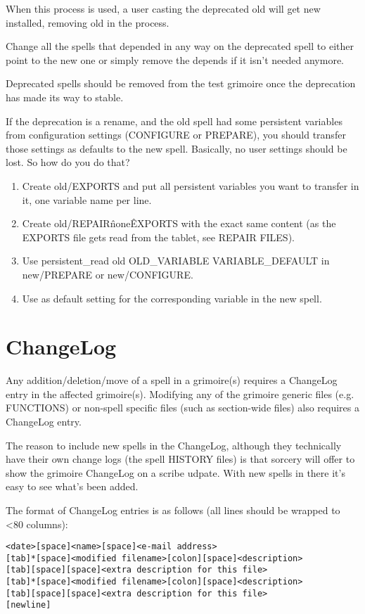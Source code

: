 \documentclass[a4paper,10pt]{book}
\begin{document}
When this process is used, a user casting the deprecated old will get new
installed, removing old in the process.

Change all the spells that depended in any way on the deprecated spell to
either point to the new one or simply remove the depends if it isn't needed
anymore.

Deprecated spells should be removed from the test grimoire once the
deprecation has made its way to stable.

If the deprecation is a rename, and the old spell had some persistent
variables from configuration settings (CONFIGURE or PREPARE), you should
transfer those settings as defaults to the new spell. Basically, no user
settings should be lost. So how do you do that?
\begin{enumerate}
\item Create old/EXPORTS and put all persistent variables you want to
	transfer in it, one variable name per line.
\item Create old/REPAIR\^none\^EXPORTS with the exact same content (as the
	EXPORTS file gets read from the tablet, see REPAIR FILES).
\item Use persistent\_read old OLD\_VARIABLE VARIABLE\_DEFAULT in new/PREPARE
	or new/CONFIGURE.
\item Use  as default setting for
the
	corresponding variable in the new spell.
\end{enumerate}

\section{ChangeLog}
Any addition/deletion/move of a spell in a grimoire(s) requires a ChangeLog
entry in the affected grimoire(s). Modifying any of the grimoire generic
files (e.g. FUNCTIONS) or non-spell specific files (such as section-wide
files) also requires a ChangeLog entry.

The reason to include new spells in the ChangeLog, although they technically
have their own change logs (the spell HISTORY files) is that sorcery will offer
to show the grimoire ChangeLog on a scribe udpate. With new spells in there
it's easy to see what's been added.

The format of ChangeLog entries is as follows (all lines should be wrapped
to <80 columns):
\begin{verbatim}
<date>[space]<name>[space]<e-mail address>
[tab]*[space]<modified filename>[colon][space]<description>
[tab][space][space]<extra description for this file>
[tab]*[space]<modified filename>[colon][space]<description>
[tab][space][space]<extra description for this file>
[newline]
\end{verbatim}
\end{document}

